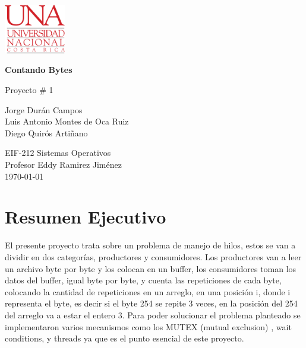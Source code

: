 \documentclass[12pt, article, natbib]{IEEEtran}
\begin{document}
\begin{titlepage}
	\includegraphics[width=0.2\textwidth]{./logo-UNA blanco.png}      
   	\begin{changemargin}{4.5cm}{0cm}
       	\textbf{\Huge Contando Bytes}

       	\vspace{0.2cm}
       	\LARGE Proyecto \# 1
            
       	\vspace{3cm}
		\Large
       	Jorge Durán Campos \\ 
       	Luis Antonio Montes de Oca Ruiz \\ 
       	Diego Quirós Artiñano \\ 

       	\vspace{3cm}
       
		EIF-212 Sistemas Operativos \\
       	Profesor Eddy Ramirez Jiménez \\
		       	
       	\vspace{3cm}
       	\today
	\end{changemargin}
\end{titlepage}

\onecolumn
    \renewcommand{\contentsname}{\large Índice \\ \hrulefill}
\tableofcontents
\setcounter{tocdepth}{2}
\newpage
\section{Resumen Ejecutivo}
El presente proyecto trata sobre un problema de manejo de hilos, estos se van a dividir en dos categorías, productores y consumidores. Los productores van a leer un archivo byte por byte y los colocan en un buffer, los consumidores toman los datos del buffer, igual byte por byte, y cuenta las repeticiones de cada byte, colocando la cantidad de repeticiones en un arreglo, en una posición i, donde i representa el byte, es decir si el byte 254 se repite 3 veces, en la posición del 254 del arreglo va a estar el entero 3. Para poder solucionar el problema planteado se implementaron varios mecanismos como los MUTEX (mutual exclusion) \cite{whiletruethendream_2020_mutex}, wait conditions, y threads ya que es el punto esencial de este proyecto.\cite{threadsInCEducative} \cite{codevault_2020_short} \cite{portfoliocourses_2022_introduction} \cite{whiletruethendream_2018_programar}\\
\end{document}
